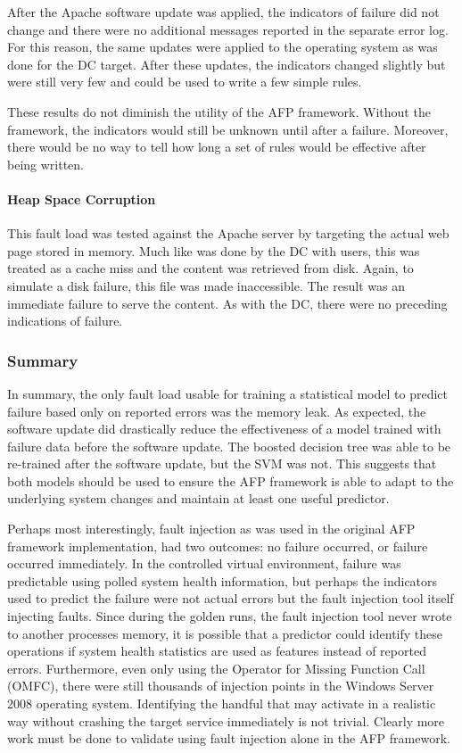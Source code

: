 After the Apache software update was applied, the indicators of failure did not
change and there were no additional messages reported in the separate error
log.  For this reason, the same updates were applied to the operating system as
was done for the \ac{DC} target.  After these updates, the indicators changed
slightly but were still very few and could be used to write a few simple rules.

These results do not diminish the utility of the \ac{AFP} framework.  Without
the framework, the indicators would still be unknown until after a failure.
Moreover, there would be no way to tell how long a set of rules would be
effective after being written.

\paragraph{Heap Space Corruption}
This fault load was tested against the Apache server by targeting the actual
web page stored in memory.  Much like was done by the \ac{DC} with users, this
was treated as a cache miss and the content was retrieved from disk.  Again, to
simulate a disk failure, this file was made inaccessible.  The result was an
immediate failure to serve the content.  As with the \ac{DC}, there were no
preceding indications of failure.

\subsubsection{Summary}
In summary, the only fault load usable for training a statistical model to
predict failure based only on reported errors was the memory leak.  As
expected, the software update did drastically reduce the effectiveness of a
model trained with failure data before the software update.  The boosted
decision tree was able to be re-trained after the software update, but the
\ac{SVM} was not.  This suggests that both models should be used to ensure the
\ac{AFP} framework is able to adapt to the underlying system changes and
maintain at least one useful predictor.

Perhaps most interestingly, fault injection as was used in the original
\ac{AFP} framework implementation, had two outcomes: no failure occurred, or
failure occurred immediately.  In the controlled virtual environment, failure
was predictable using polled system health information, but perhaps the
indicators used to predict the failure were not actual errors but the fault
injection tool itself injecting faults.  Since during the golden runs, the
fault injection tool never wrote to another processes memory, it is possible
that a predictor could identify these operations if system health statistics
are used as features instead of reported errors.  Furthermore, even only using
the Operator for Missing Function Call (OMFC), there were still thousands of
injection points in the Windows Server 2008 operating system.  Identifying the
handful that may activate in a realistic way without crashing the target
service immediately is not trivial.  Clearly more work must be done to validate
using fault injection alone in the \ac{AFP} framework.

